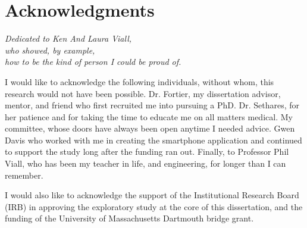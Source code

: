 \documentclass{umthesis}
\begin{document}


%
    


\chapter*{Acknowledgments}             %
	\begin{center}
	\emph{Dedicated to Ken And Laura Viall, \\ who showed, by example, \\ how to be the kind of person I could be proud of.}
	\end{center}
  
  \parskip
  \parskip
  
  I would like to acknowledge the following individuals, without whom, this research would not have been possible. Dr. Fortier, my dissertation advisor, mentor, and friend who first recruited me into pursuing a PhD. Dr. Sethares, for her patience and for taking the time to educate me on all matters medical. My committee, whose doors have always been open anytime I needed advice. Gwen Davis who worked with me in creating the smartphone application and continued to support the study long after the funding ran out. Finally, to Professor Phil Viall, who has been my teacher in life, and engineering, for longer than I can remember. 
  
  I would also like to acknowledge the support of the Institutional Research Board (IRB) in approving the exploratory study at the core of this dissertation, and the funding of the University of Massachusetts Dartmouth bridge grant.

\cleardoublepage
{}




\clearpage
\tableofcontents				 %
\clearpage
{}
{}
\listoffigures                  %
\end{document}
